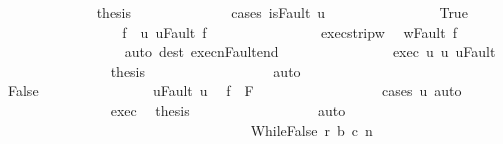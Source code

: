 \begin{isabellebody}
\ \ \ \ \ \ \ \ \ \ \ \ \isamarkupfalse%
\ {\isacharquery}thesis\isanewline
\ \ \ \ \ \ \ \ \ \ \ \ \isamarkupfalse%
\ {\isacharparenleft}cases\ {\isachardoublequoteopen}isFault\ u{\isachardoublequoteclose}{\isacharparenright}\isanewline
\ \ \ \ \ \ \ \ \ \ \ \ \ \ \isamarkupfalse%
\ True\isanewline
\ \ \ \ \ \ \ \ \ \ \ \ \ \ \isamarkupfalse%
\ \isamarkupfalse%
\ f\ \ u{\isacharcolon}\ {\isachardoublequoteopen}u{\isacharequal}Fault\ f{\isachardoublequoteclose}\isacommand{{\isachardot}{\isachardot}}\isamarkupfalse%
\isanewline
\ \ \ \ \ \ \ \ \ \ \ \ \ \ \isamarkupfalse%
\ exec{\isacharunderscore}strip{\isacharunderscore}w\ \isamarkupfalse%
\ {\isachardoublequoteopen}w{\isacharequal}Fault\ f{\isachardoublequoteclose}\isanewline
\ \ \ \ \ \ \ \ \ \ \ \ \ \ \ \ \isamarkupfalse%
\ {\isacharparenleft}auto\ dest{\isacharcolon}\ execn{\isacharunderscore}Fault{\isacharunderscore}end{\isacharparenright}\isanewline
\ \ \ \ \ \ \ \ \ \ \ \ \ \ \isamarkupfalse%
\ exec\ u{\isacharprime}\ u\ u{\isacharprime}{\isacharunderscore}Fault\isanewline
\ \ \ \ \ \ \ \ \ \ \ \ \ \ \isamarkupfalse%
\ {\isacharquery}thesis\isanewline
\ \ \ \ \ \ \ \ \ \ \ \ \ \ \ \ \isamarkupfalse%
\ auto\isanewline
\ \ \ \ \ \ \ \ \ \ \ \ \isamarkupfalse%
\isanewline
\ \ \ \ \ \ \ \ \ \ \ \ \ \ \isamarkupfalse%
\ False\isanewline
\ \ \ \ \ \ \ \ \ \ \ \ \ \ \isamarkupfalse%
\ u{\isacharprime}{\isacharunderscore}Fault\ u{\isacharprime}\ \isamarkupfalse%
\ {\isachardoublequoteopen}f{\isacharprime}\ {\isasymin}\ F{\isachardoublequoteclose}\isanewline
\ \ \ \ \ \ \ \ \ \ \ \ \ \ \ \ \isamarkupfalse%
\ {\isacharparenleft}cases\ u{\isacharparenright}\ auto\isanewline
\ \ \ \ \ \ \ \ \ \ \ \ \ \ \isamarkupfalse%
\ exec\ \isamarkupfalse%
\ {\isacharquery}thesis\isanewline
\ \ \ \ \ \ \ \ \ \ \ \ \ \ \ \ \isamarkupfalse%
\ auto\isanewline
\ \ \ \ \ \ \ \ \ \ \ \ \isamarkupfalse%
\isanewline
\ \ \ \ \ \ \ \ \ \ \isamarkupfalse%
\isanewline
\ \ \ \ \ \ \ \ \isamarkupfalse%
\isanewline
\ \ \ \ \ \ \isamarkupfalse%
\isanewline
\ \ \ \ \ \ \ \ \isamarkupfalse%
\ {\isacharparenleft}WhileFalse\ r\ b{\isacharprime}\ c{\isacharprime}{\isacharprime}\ n{\isacharparenright}\isanewline
\ \ \ \ \ \ \ \ \isamarkupfalse%

\end{isabellebody}
